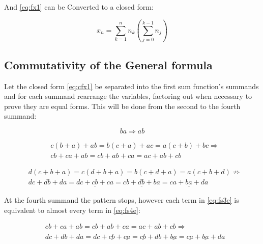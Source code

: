 \documentclass[a4paper]{article}
\begin{document}
And \eqref{eq:fx1} can be Converted to a closed form:

\begin{equation}
x_n = \sum_{k=1}^{n} {n_k(\sum_{j=0}^{k-1} {n_j})} \label{eq:cfx1}
\end{equation}

\subsection{Commutativity of the General formula}
Let the closed form \eqref{eq:cfx1} be separated into the first sum function's summands and for each summand rearrange the variables, factoring out when necessary to prove they are equal forms. This will be done from the second to the fourth summand:

\begin{equation}
ba \Rightarrow ab \label{eq:fs2e}
\end{equation}

\begin{equation} \begin{aligned}
& c(b + a) + ab = b(c + a) + ac = a(c + b) + bc \Rightarrow \\
& cb + ca + ab = cb + ab + ca = ac + ab + cb \label{eq:fs3e}
\end{aligned} \end{equation}

\begin{equation} \begin{aligned}
& d(c + b + a) = c(d + b + a) = b(c + d + a) = a(c + b + d) \not \Rightarrow \\
& dc + db + da = \underline{dc + cb + ca} = \underline{cb + db + ba} = \underline{ca + ba + da} \label{eq:fs4e}
\end{aligned} \end{equation}

At the fourth summand the pattern stops, however each term in \eqref{eq:fs3e} is equivalent to almost every term in \eqref{eq:fs4e}:

\begin{equation*} \begin{aligned}
& \underline{cb} + \underline{ca} + \underline{ab} = \underline{cb} + \underline{ab} + \underline{ca} = \underline{ac} + \underline{ab} + \underline{cb} \Rightarrow \\
& dc + db + da = dc + \underline{cb} + \underline{ca} = \underline{cb} + db + \underline{ba}  = \underline{ca} + \underline{ba} + da
\end{aligned} \end{equation*}
\end{document}
